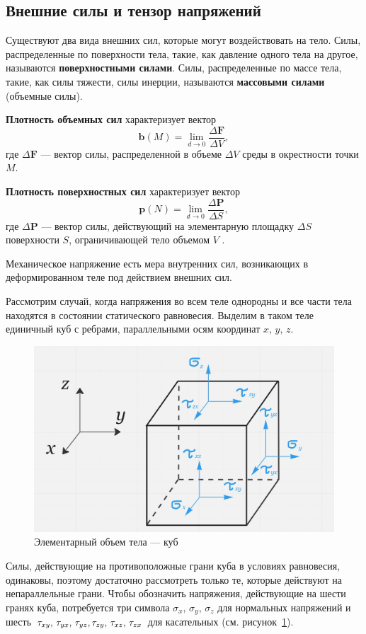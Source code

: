 \documentclass[12pt, a4paper]{article}
\begin{document}
		
	\subsection{Внешние силы и тензор напряжений}
Существуют два вида внешних сил, которые могут воздействовать на тело. Силы, распределенные по поверхности тела, такие, как давление одного тела на другое, называются \textbf{поверхностными силами}. Силы, распределенные по массе тела, такие, как силы тяжести, силы инерции, называются \textbf{массовыми силами} (объемные силы).

\textbf{Плотность объемных сил} характеризует вектор
\begin{equation}
	\boldsymbol b(M) = \lim\limits_{d\to0}\frac{\Delta \boldsymbol F}{\Delta V},
\end{equation}
где $\Delta \boldsymbol F$ --- вектор силы, распределенной в объеме $\Delta V$ среды в окрестности точки $M$.

\textbf{Плотность поверхностных сил} характеризует вектор
\begin{equation}
	\boldsymbol p(N) = \lim\limits_{d\to0}\frac{\Delta \boldsymbol P}{\Delta S},
\end{equation}
где $\Delta \boldsymbol P$ --- вектор силы, действующий на элементарную площадку $\Delta S$ поверхности $S$, ограничивающей тело объемом $V$ \cite{zarubin}.
	
Механическое напряжение есть мера внутренних сил, возникающих в деформированном теле под действием внешних сил.
	
	Рассмотрим случай, когда напряжения во всем теле однородны и все части тела находятся в состоянии статического равновесия. Выделим в таком теле единичный куб с ребрами, параллельными осям координат $x,\,y,\,z$.
	\begin{figure}[H]
		\centering
		\includegraphics[width=12cm]{p6}
		\caption{Элементарный объем тела --- куб}
		\label{fig:p6}
	\end{figure}
Силы, действующие на противоположные грани куба в условиях равновесия, одинаковы, поэтому достаточно рассмотреть только те, которые действуют на непараллельные грани. Чтобы обозначить напряжения, действующие на шести гранях куба, потребуется три символа $\sigma_x,\,\sigma_y,\,\sigma_z$ для нормальных напряжений и шесть $\tau_{xy},\,\tau_{yx},\,\tau_{yz},\\\tau_{zy},\,\tau_{xz},\,\tau_{zx}$ для касательных (см. рисунок~\ref{fig:p6}).
\end{document}
